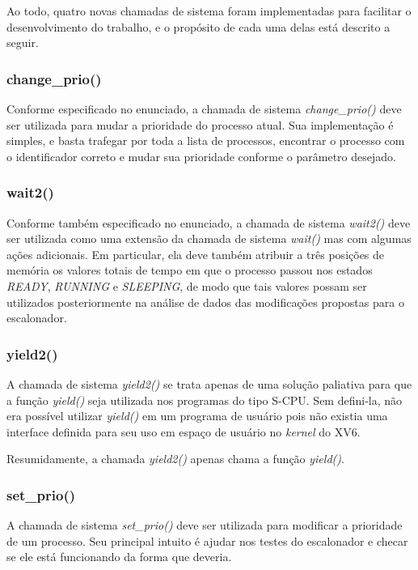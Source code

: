 \documentclass{article}
\begin{document}
Ao todo, quatro novas chamadas de sistema foram implementadas para facilitar o
desenvolvimento do trabalho, e o propósito de cada uma delas está descrito a
seguir.

\subsubsection{change\_prio()}

Conforme especificado no enunciado, a chamada de sistema
\textit{change\_prio()} deve ser utilizada para mudar
a prioridade do processo atual. Sua implementação é simples, e basta trafegar
por toda a lista de processos, encontrar o processo com o identificador correto
e mudar sua prioridade conforme o parâmetro desejado.

\subsubsection{wait2()}

Conforme também especificado no enunciado, a chamada de sistema
\textit{wait2()} deve ser utilizada como uma
extensão da chamada de sistema \textit{wait()} mas com algumas ações adicionais. Em
particular, ela deve também atribuir a três posições de memória os valores
totais de tempo em que o processo passou nos estados \textit{READY},
\textit{RUNNING} e \textit{SLEEPING}, de modo que tais valores possam ser
utilizados posteriormente na análise de dados das modificações propostas para o
escalonador.

\subsubsection{yield2()}

A chamada de sistema \textit{yield2()} se trata apenas de uma solução paliativa
para que a função \textit{yield()} seja utilizada
nos programas do tipo S-CPU. Sem defini-la, não era possível utilizar
\textit{yield()} em um programa de usuário pois não existia uma interface
definida para seu uso em espaço de usuário no \textit{kernel} do XV6.

Resumidamente, a chamada \textit{yield2()} apenas chama a função \textit{yield()}.

\subsubsection{set\_prio()}

A chamada de sistema \textit{set\_prio()} deve ser utilizada para modificar a
prioridade de um processo. Seu principal intuito é ajudar nos testes do
escalonador e checar se ele está funcionando da forma que deveria.
\end{document}
